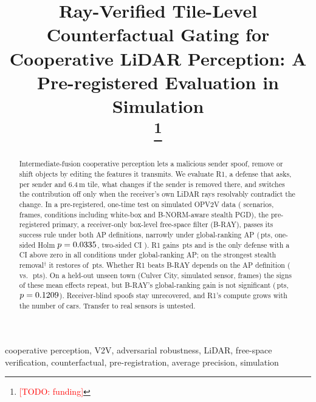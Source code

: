 \documentclass[conference]{IEEEtran}
\newcommand{\TODO}[1]{\textcolor{red}{[TODO: #1]}}
\newcommand{\pts}{\,pts}
\begin{document}
\title{Ray-Verified Tile-Level Counterfactual Gating for Cooperative LiDAR Perception:
A Pre-registered Evaluation in Simulation\\
\thanks{\TODO{funding}}}

\author{\IEEEauthorblockN{\TODO{Author names}}
\IEEEauthorblockA{\TODO{Affiliation}\\
\TODO{City, Country}\\
\TODO{email}}}

\maketitle

\begin{abstract}
Intermediate-fusion cooperative perception lets a malicious sender spoof, remove or shift objects by editing
the features it transmits. We evaluate R1, a defense that asks, per sender and 6.4\,m tile, what changes if the
sender is removed there, and switches the contribution off only when the receiver's own LiDAR rays resolvably
contradict the change. In a pre-registered, one-time test on simulated OPV2V data (\TestScenarios{} scenarios,
\TestFrames{} frames, \NumConditions{} conditions including white-box and B-NORM-aware stealth PGD), the
pre-registered primary, a receiver-only box-level free-space filter (B-RAY), passes its success rule under both
AP definitions, narrowly under global-ranking AP (\VGlobBRAYDelta\pts, one-sided Holm $p=0.0335$, two-sided
CI \VGlobBRAYCI). R1 gains \VGlobRONEDelta\pts{} and is the only defense with a CI above zero in all
\NumConditions{} conditions under global-ranking AP; on the strongest stealth removal$^\dagger$ it restores
\dGlobPgdRemStStrongRONE{} of \LossGlobPgdRemStStrong\pts. Whether R1 beats B-RAY depends on the AP definition
(\VGlobRmB{} vs.\ \VFrameRmB\pts). On a held-out unseen town (Culver City, simulated sensor, \CulFrames{} frames)
the signs of these mean effects repeat, but B-RAY's global-ranking gain is not significant
(\CulHeadGlobBRAY\pts, $p=0.1209$). Receiver-blind spoofs stay unrecovered, and R1's compute grows with
the number of cars. Transfer to real sensors is untested.
\end{abstract}

\begin{IEEEkeywords}
cooperative perception, V2V, adversarial robustness, LiDAR, free-space verification, counterfactual,
pre-registration, average precision, simulation
\end{IEEEkeywords}
\end{document}
